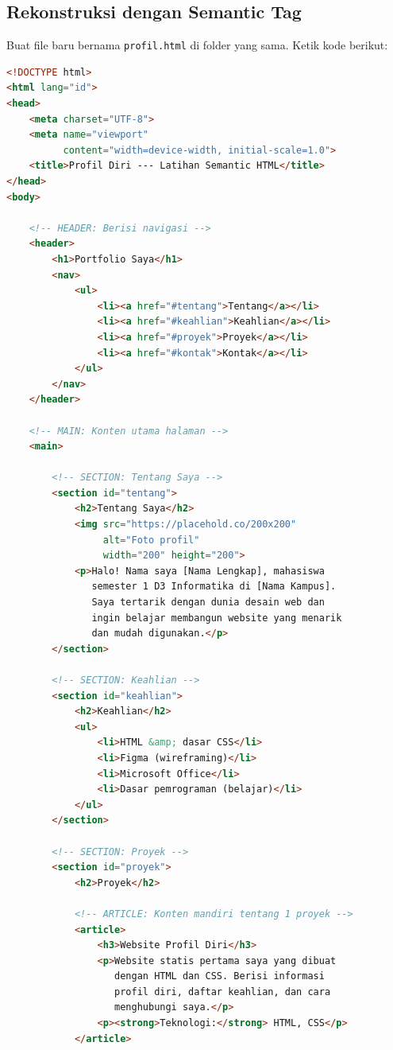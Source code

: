 \subsection{Rekonstruksi dengan Semantic Tag}

Buat file baru bernama \texttt{profil.html} di folder yang sama. Ketik kode berikut:

\begin{lstlisting}[language=HTML, caption={Halaman profil dengan semantic HTML}, label={lst:m03-profil}]
<!DOCTYPE html>
<html lang="id">
<head>
    <meta charset="UTF-8">
    <meta name="viewport"
          content="width=device-width, initial-scale=1.0">
    <title>Profil Diri --- Latihan Semantic HTML</title>
</head>
<body>

    <!-- HEADER: Berisi navigasi -->
    <header>
        <h1>Portfolio Saya</h1>
        <nav>
            <ul>
                <li><a href="#tentang">Tentang</a></li>
                <li><a href="#keahlian">Keahlian</a></li>
                <li><a href="#proyek">Proyek</a></li>
                <li><a href="#kontak">Kontak</a></li>
            </ul>
        </nav>
    </header>

    <!-- MAIN: Konten utama halaman -->
    <main>

        <!-- SECTION: Tentang Saya -->
        <section id="tentang">
            <h2>Tentang Saya</h2>
            <img src="https://placehold.co/200x200"
                 alt="Foto profil"
                 width="200" height="200">
            <p>Halo! Nama saya [Nama Lengkap], mahasiswa
               semester 1 D3 Informatika di [Nama Kampus].
               Saya tertarik dengan dunia desain web dan
               ingin belajar membangun website yang menarik
               dan mudah digunakan.</p>
        </section>

        <!-- SECTION: Keahlian -->
        <section id="keahlian">
            <h2>Keahlian</h2>
            <ul>
                <li>HTML &amp; dasar CSS</li>
                <li>Figma (wireframing)</li>
                <li>Microsoft Office</li>
                <li>Dasar pemrograman (belajar)</li>
            </ul>
        </section>

        <!-- SECTION: Proyek -->
        <section id="proyek">
            <h2>Proyek</h2>

            <!-- ARTICLE: Konten mandiri tentang 1 proyek -->
            <article>
                <h3>Website Profil Diri</h3>
                <p>Website statis pertama saya yang dibuat
                   dengan HTML dan CSS. Berisi informasi
                   profil diri, daftar keahlian, dan cara
                   menghubungi saya.</p>
                <p><strong>Teknologi:</strong> HTML, CSS</p>
            </article>


\end{lstlisting}
